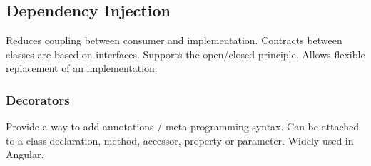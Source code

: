 \subsection{Dependency Injection}
Reduces coupling between consumer and implementation.
Contracts between classes are based on interfaces.
Supports the open/closed principle.
Allows flexible replacement of an implementation.

\subsubsection{Decorators}
Provide a way to add annotations / meta-programming syntax.
Can be attached to a class declaration, method, accessor, property or parameter.
Widely used in Angular.